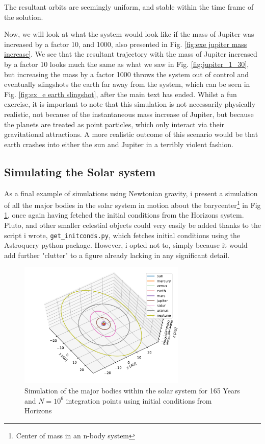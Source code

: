 \documentclass[10pt,showpacs,preprintnumbers,amsmath,amssymb,nofootinbib,aps,prl,twocolumn,groupedaddress,superscriptaddress,showkeys]{revtex4-1}
\begin{document}
  The resultant orbits are seemingly uniform, and stable within the time frame of the solution.

  Now, we will look at what the system would look like if the mass of Jupiter was increased by a factor 10, and 1000, also presented in Fig. \ref{fig:exe jupiter mass increase}. We see that the resultant trajectory with the mass of Jupiter increased by a factor 10 looks much the same as what we saw in Fig. \ref{fig:jupiter_1_30}, but increasing the mass by a factor 1000 throws the system out of control and eventually slingshots the earth far away from the system, which can be seen in Fig. \ref{fig:ex_e earth slingshot}, after the main text has ended. Whilst a fun exercise, it is important to note that this simulation is not necessarily physically realistic, not because of the instantaneous mass increase of Jupiter, but because the planets are treated as point particles, which only interact via their gravitational attractions. A more realistic outcome of this scenario would be that earth crashes into either the sun and Jupiter in a terribly violent fashion.

\subsection{Simulating the Solar system}
  As a final example of simulations using Newtonian gravity, i present a simulation of all the major bodies in the solar system in motion about the barycenter\footnote{Center of mass in an n-body system} in Fig \ref{fig:solarsystem}, once again having fetched the initial conditions from the Horizons system.
  Pluto, and other smaller celestial objects could very easily be added thanks to the script i wrote, \lstinline{get_initconds.py}, which fetches initial conditions using the Astroquery python package. However, i opted not to, simply because it would add further "clutter" to a figure already lacking in any significant detail.


\begin{figure}[H]
  \center
  \includegraphics[width=8cm]{figs/all_bodies.pdf}
  \caption{Simulation of the major bodies within the solar system for 165 Years and $N=10^6$ integration points using initial conditions from Horizons}
  \label{fig:solarsystem}
\end{figure}
\end{document}
